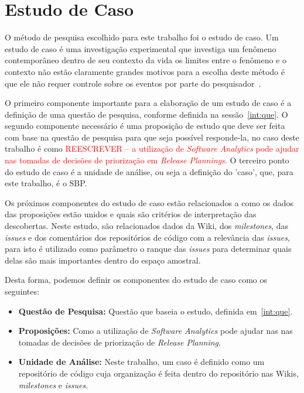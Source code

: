 \section{Estudo de Caso}
\label{met:est}
O método de pesquisa escolhido para este trabalho foi o estudo de caso. Um estudo de caso é uma investigação experimental que investiga um fenômeno contemporâneo dentro de seu contexto da vida 
os limites entre o fenômeno e o contexto não estão claramente 
grandes motivos para a escolha deste método é que ele não requer controle sobre os eventos por parte do pesquisador~\cite{yin}.

O primeiro componente importante para a elaboração de um estudo de caso é a definição de uma questão de pesquisa, conforme definida na sessão~\ref{int:que}. O segundo componente necessário é uma proposição de estudo que deve ser feita com base na questão 
de pesquisa para que seja possível responde-la, no caso deste trabalho é como \textcolor{red}{ REESCREVER --
 a utilização de \textit{Software 
Analytics} pode ajudar nas tomadas de decisões de priorização em \textit{Release Plannings}.} O terceiro ponto do estudo de caso é a unidade de análise, ou seja a definição do 'caso',
que, para este trabalho, é o SBP.

Os próximos componentes do estudo de caso estão relacionados a como os dados das
proposições estão unidos e quais são critérios de interpretação das descobertas.
Neste estudo, são relacionados dados da Wiki, dos \textit{milestones}, das \textit{issues} 
e dos comentários dos repositórios de código com a relevância das \textit{issues}, para isto
é utilizado como parâmetro o ranque das \textit{issues} para determinar quais delas 
são mais importantes dentro do espaço amostral.




Desta forma, podemos definir os componentes do estudo de caso como os seguintes:

\begin{itemize}
    \item \textbf{Questão de Pesquisa:} Questão que baseia o estudo, definida em~\ref{int:que}.
    \item \textbf{Proposições:} Como a utilização de \textit{Software Analytics} pode ajudar nas
    nas tomadas de decisões de priorização de \textit{Release Planning}.
    \item \textbf{Unidade de Análise:} Neste trabalho, um caso é definido como um repositório
        de código cuja organização é feita dentro do repositório nas Wikis, \textit{milestones}
        e \textit{issues}.
\end{itemize}


